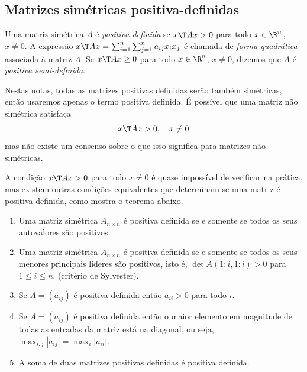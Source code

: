 \documentclass{article}
\begin{document}
\subsection{Matrizes simétricas positiva-definidas}

\begin{defn}
    Uma matriz simétrica \(A\) é \emph{positiva definida} se \(x\T  A x > 0\) para todo \(x \in \R^n\), \(x \neq 0\). A expressão \(x\T  A x = \sum_{i=1}^n \sum_{j=1}^n a_{ij} x_i x_j\) é chamada de \emph{forma quadrática} associada à matriz \(A\). Se \(x\T  A x \geq 0\) para todo \(x \in \R^n\), \(x \neq 0\), dizemos que \(A\) é \emph{positiva semi-definida}.
\end{defn}

\begin{rem}
    Nestas notas, todas as matrizes positivas definidas serão também simétricas, então usaremos apenas o termo positiva definida. É possível que uma matriz não simétrica satisfaça
    \[
        x\T  A x > 0, \quad x \neq 0
    \]
    mas não existe um consenso sobre o que isso significa para matrizes não simétricas.
\end{rem}

A condição \(x\T  A x > 0\) para todo \(x \neq 0\) é quase impossível de verificar na prática, mas existem outras condições equivalentes que determinam se uma matriz é positiva definida, como mostra o teorema abaixo.

\begin{thm}\label{thm:positiva_definida}
    \begin{enumerate}
        \item Uma matriz simétrica \(A_{n \times n}\) é positiva definida se e somente se todos os seus autovalores são positivos.
        \item Uma matriz simétrica \(A_{n \times n}\) é positiva definida se e somente se todos os seus menores principais líderes são positivos, isto é, \(\det A(1:i, 1:i) > 0\) para \(1 \leq i \leq n\). (critério de Sylvester).
        \item Se \(A = (a_{ij})\) é positiva definida então \(a_{ii} > 0\) para todo \(i\).
        \item Se \(A = (a_{ij})\) é positiva definida então o maior elemento em magnitude de todas as entradas da matriz está na diagonal, ou seja, \(\max_{i,j} |a_{ij}| = \max_i |a_{ii}|\).
        \item A soma de duas matrizes positivas definidas é positiva definida.
    \end{enumerate} 
\end{thm}
\end{document}
